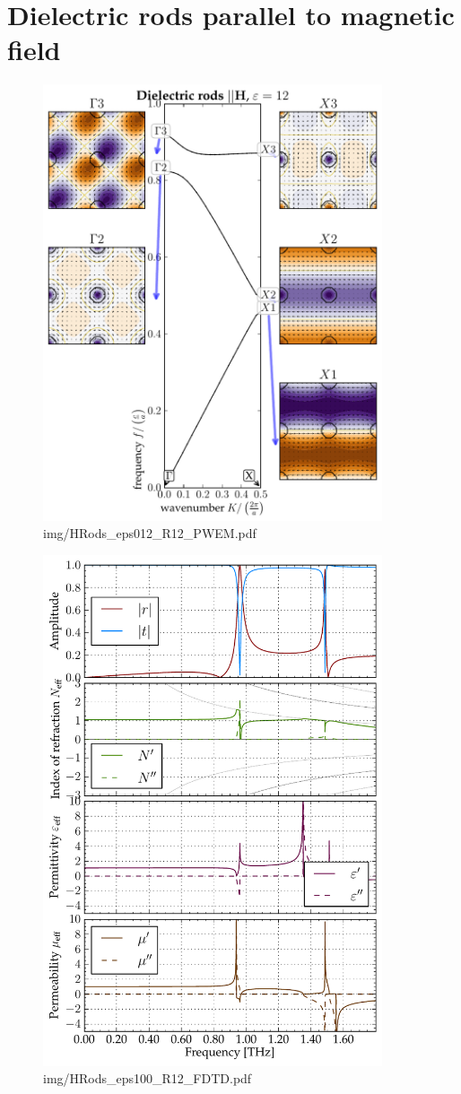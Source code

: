 \section{Dielectric rods parallel to magnetic field} %
\begin{figure} \caption{img/HRods\_eps012\_R12\_PWEM.pdf}  \centering \includegraphics[width=10cm]{img/HRods_eps012_R12_PWEM.pdf} \end{figure} \clearpage
\begin{figure} \caption{img/HRods\_eps100\_R12\_FDTD.pdf}  \centering \includegraphics[width=10cm]{img/HRods_eps100_R12_FDTD.pdf} \end{figure} \clearpage
